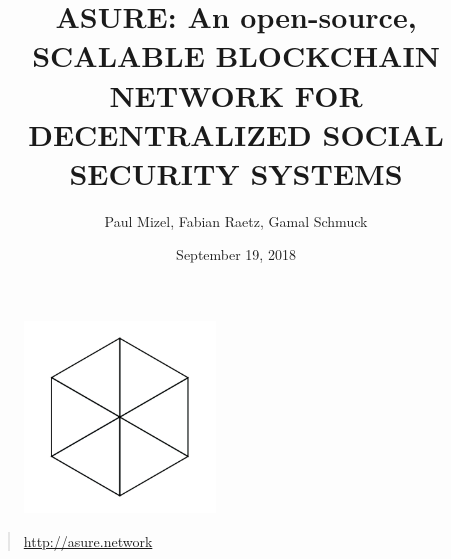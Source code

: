 \begin{figure}
    \centering
    \includegraphics[width=2.0in]{logo.png}
\end{figure}

\title{ASURE: An open-source, SCALABLE BLOCKCHAIN NETWORK FOR DECENTRALIZED SOCIAL SECURITY SYSTEMS}
\author{Paul Mizel, Fabian Raetz, Gamal Schmuck}
\date{September 19, 2018}
\maketitle

\vskip 2in

\begin{quote}
	\centering
	\url{http://asure.network}
\end{quote}

\newpage 
